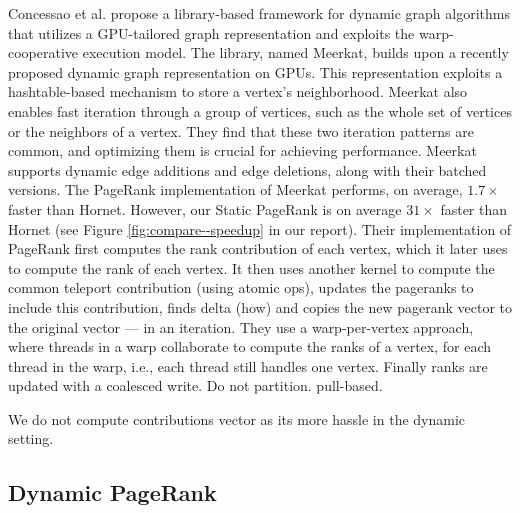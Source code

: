 Concessao et al. \cite{concessao2023meerkat} propose a library-based framework for dynamic graph algorithms that utilizes a GPU-tailored graph representation and exploits the warp-cooperative execution model. The library, named Meerkat, builds upon a recently proposed dynamic graph representation on GPUs. This representation exploits a hashtable-based mechanism to store a vertex’s neighborhood. Meerkat also enables fast iteration through a group of vertices, such as the whole set of vertices or the neighbors of a vertex. They find that these two iteration patterns are common, and optimizing them is crucial for achieving performance. Meerkat supports dynamic edge additions and edge deletions, along with their batched versions. The PageRank implementation of Meerkat performs, on average, $1.7\times$ faster than Hornet. However, our Static PageRank is on average $31\times$ faster than Hornet (see Figure \ref{fig:compare--speedup} in our report).
Their implementation of PageRank first computes the rank contribution of each vertex, which it later uses to compute the rank of each vertex. It then uses another kernel to compute the common teleport contribution (using atomic ops), updates the pageranks to include this contribution,  finds delta (how) and copies the new pagerank vector to the original vector --- in an iteration. They use a warp-per-vertex approach, where threads in a warp collaborate to compute the ranks of a vertex, for each thread in the warp, i.e., each thread still handles one vertex. Finally ranks are updated with a coalesced write. Do not partition. pull-based.

We do not compute contributions vector as its more hassle in the dynamic setting.


\subsection{Dynamic PageRank}

